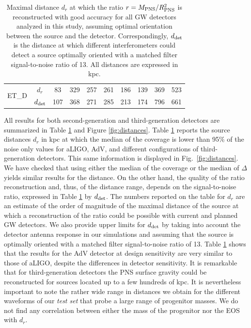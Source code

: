 \begin{table}
\begin{tabular}{c|c|cccccccc}
\hline
\multirow{2}{*}{ET\_D} & $d_{r}$ & 83  & 329 & 257 & 261 & 186 & 139 & 369 & 523 \\
\cline{2-10}
                       & $d_{\rm det}$ & 107 & 368 & 271 & 285 & 213 & 174 & 796  & 661\\

  \end{tabular}
  \caption{%
  Maximal distance $d_{r}$ at which the ratio $r=M_{\rm PNS}/R_{\rm PNS}^2$ is reconstructed
    with good accuracy for all GW detectors analyzed in this study, assuming optimal orientation between the source and the detector. Correspondingly, $d_{\rm det}$ is the distance at which different interferometers could detect a source
    optimally oriented with a matched filter signal-to-noise ratio of 13. All distances are expressed in kpc.
  }
  \label{tab:results}
\end{table}

All results for both second-generation and third-generation detectors are summarized in Table \ref{tab:results} and Figure
\ref{fig:distances}. Table \ref{tab:results} reports the source distances $d_r$ in kpc at which the median of the coverage is lower than 95\% of the noise only values for aLIGO, AdV, and different configurations of third-generation detectors. This same information is displayed in Fig.~\ref{fig:distances}. We have checked that using either the median of the coverage or the median of $\Delta$ yields similar results for the distance. On the other hand, the quality of the ratio reconstruction and, thus, of the distance range, depends on the signal-to-noise ratio, expressed in Table \ref{tab:results} by $d_{\rm det}$. The numbers reported on the table for $d_r$ are an estimate of the order of magnitude of the maximal distance of the source  at which a
reconstruction of the ratio could be possible with current and planned GW detectors. We also provide upper limits for $d_{\rm det}$ by taking into account the detector antenna response in our simulations and assuming that the source is optimally oriented with a matched filter signal-to-noise ratio of 13. Table \ref{tab:results} shows that the results for the AdV detector at design sensitivity are very similar to those of aLIGO, despite the differences in detector sensitivity. It is remarkable that for third-generation detectors the PNS surface gravity  could be reconstructed for sources located up to a few hundreds of kpc. It is nevertheless important to note the rather wide range in distances we obtain for the different waveforms of our {\it test set} that probe a large range of progenitor masses. We do not find any correlation between either the mass of the progenitor nor the EOS with $d_r$.

